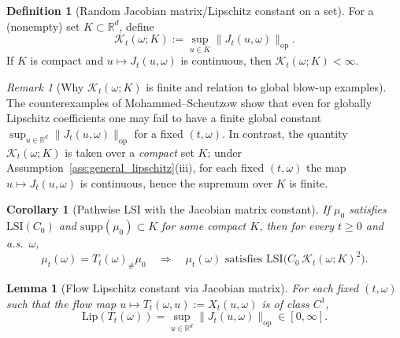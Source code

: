 \documentclass{tsp-short}
\newtheorem{lemma}{Lemma}[section]
\newtheorem{corollary}{Corollary}[section]
\theoremstyle{remark}
\newtheorem{remark}{Remark}[section]
\theoremstyle{definition}
\newtheorem{definition}{Definition}[section]
\begin{document}
\begin{definition}[Random Jacobian matrix/Lipschitz constant on a set]\label{def:jacobian-constant}
For a (nonempty) set $K\subset\mathbb{R}^d$, define
\begin{equation*}
\mathcal{K}_t(\omega;K):=\sup_{u\in K}\|J_t(u,\omega)\|_{\mathrm{op}}.
\end{equation*}
If $K$ is compact and $u\mapsto J_t(u,\omega)$ is continuous, then $\mathcal{K}_t(\omega;K)<\infty$.
\end{definition}

\begin{remark}[Why $\mathcal{K}_t(\omega;K)$ is finite and relation to global blow-up examples]
The counterexamples of Mohammed--Scheutzow show that even for globally Lipschitz coefficients one may fail to have a finite
global constant $\sup_{u\in\mathbb{R}^d}\|J_t(u,\omega)\|_{\mathrm{op}}$ for a fixed $(t,\omega)$.
In contrast, the quantity $\mathcal{K}_t(\omega;K)$ is taken over a \emph{compact} set $K$; under Assumption~\ref{ass:general_lipschitz}(iii),
for each fixed $(t,\omega)$ the map $u\mapsto J_t(u,\omega)$ is continuous, hence the supremum over $K$ is finite.
\end{remark}

\begin{corollary}[Pathwise LSI with the Jacobian matrix constant]\label{cor:lsi-jacobian-constant}
If $\mu_0$ satisfies $\mathrm{LSI}(C_0)$ and $\mathrm{supp}(\mu_0)\subset K$ for some compact $K$, then for every $t\ge0$ and a.s.\ $\omega$,
\begin{equation*}
\mu_t(\omega)=T_t(\omega)_{\#}\mu_0
\quad\Longrightarrow\quad
\mu_t(\omega)\text{ satisfies }\mathrm{LSI}\big(C_0\,\mathcal{K}_t(\omega;K)^2\big).
\end{equation*}
\end{corollary}

\begin{lemma}[Flow Lipschitz constant via Jacobian matrix]\label{lem:lip-via-J}
For each fixed $(t,\omega)$ such that the flow map $u\mapsto T_t(\omega,u):=X_t(u,\omega)$ is of class $C^1$,
\begin{equation*}
\mathrm{Lip}(T_t(\omega)) = \sup_{u\in\mathbb{R}^d}\|J_t(u,\omega)\|_{\mathrm{op}}\in[0,\infty].
\end{equation*}
\end{lemma}
\end{document}
